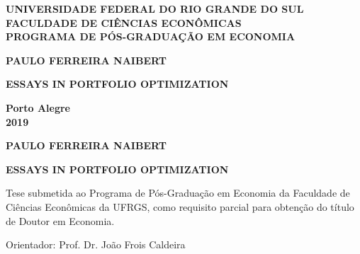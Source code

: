 \documentclass[12pt,oneside,a4paper]{memoir}
\begin{document}

\pretextual

\begin{center}
\textbf{UNIVERSIDADE FEDERAL DO RIO GRANDE DO SUL
  \\
FACULDADE DE CIÊNCIAS ECONÔMICAS
  \\
PROGRAMA DE PÓS-GRADUAÇÃO EM ECONOMIA}
\end{center}

\vspace{4.5 em}

\begin{center}
\textbf{PAULO FERREIRA NAIBERT}
\end{center}

\vspace{4.5 em}

\begin{center}
	\textbf{ESSAYS IN PORTFOLIO OPTIMIZATION}
\end{center}
\vfill

\begin{center}
\textbf{Porto Alegre
\\
2019}
\end{center}

\clearpage

\begin{center}
\textbf{PAULO FERREIRA NAIBERT}
\end{center}

\vspace{9 em}

\begin{center}
	\textbf{ESSAYS IN PORTFOLIO OPTIMIZATION}
\end{center}

\vspace{9 em}
\hfill
\begin{minipage}{.5\textwidth}
\begin{SingleSpace}
Tese submetida ao Programa de Pós-Graduação em Economia da Faculdade de Ciências Econômicas da UFRGS, como requisito parcial para obtenção do título de Doutor em Economia.

\vspace{1 em}
Orientador: Prof. Dr. João Frois Caldeira 
\end{SingleSpace}
\end{minipage}
\vfill
\end{document}

